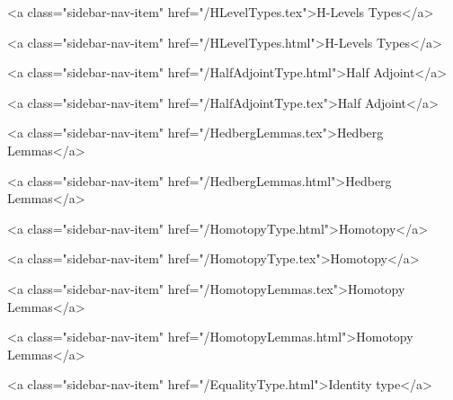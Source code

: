       
        
          <a class="sidebar-nav-item" href="/HLevelTypes.tex">H-Levels Types</a>
        
      
    
      
        
          <a class="sidebar-nav-item" href="/HLevelTypes.html">H-Levels Types</a>
        
      
    
      
        
          <a class="sidebar-nav-item" href="/HalfAdjointType.html">Half Adjoint</a>
        
      
    
      
        
          <a class="sidebar-nav-item" href="/HalfAdjointType.tex">Half Adjoint</a>
        
      
    
      
        
          <a class="sidebar-nav-item" href="/HedbergLemmas.tex">Hedberg Lemmas</a>
        
      
    
      
        
          <a class="sidebar-nav-item" href="/HedbergLemmas.html">Hedberg Lemmas</a>
        
      
    
      
        
          <a class="sidebar-nav-item" href="/HomotopyType.html">Homotopy</a>
        
      
    
      
        
          <a class="sidebar-nav-item" href="/HomotopyType.tex">Homotopy</a>
        
      
    
      
        
          <a class="sidebar-nav-item" href="/HomotopyLemmas.tex">Homotopy Lemmas</a>
        
      
    
      
        
          <a class="sidebar-nav-item" href="/HomotopyLemmas.html">Homotopy Lemmas</a>
        
      
    
      
        
          <a class="sidebar-nav-item" href="/EqualityType.html">Identity type</a>
        
      
    
